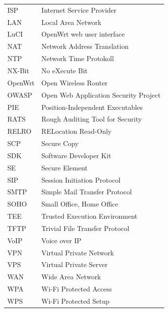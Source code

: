 \documentclass[a4paper]{book}
\begin{document}
\begin{large}
\begin{table}[!ht]
\begin{tabular}{ll}
ISP     & Internet Service Provider            \\
LAN     & Local Area Network                   \\
LuCI    & OpenWrt web user interface           \\
NAT     & Network Address Translation          \\
NTP     & Network Time Protokoll               \\
NX-Bit  & No eXecute Bit                       \\
OpenWrt & Open Wireless Router                 \\
OWASP	& Open Web Application Security Project \\
PIE     & Position-Independent Executables     \\
RATS    & Rough Auditing Tool for Security     \\
RELRO   & RELocation Read-Only                 \\
SCP     & Secure Copy                          \\
SDK     & Software Developer Kit               \\
SE      & Secure Element                       \\
SIP     & Session Initiation Protocol          \\
SMTP    & Simple Mail Transfer Protocol        \\
SOHO    & Small Office, Home Office            \\
TEE     & Trusted Execution   Environment      \\
TFTP    & Trivial File Transfer Protocol       \\
VoIP    & Voice over IP                        \\
VPN     & Virtual Private Network              \\
VPS     & Virtual Private Server               \\
WAN     & Wide Area Network                    \\
WPA     & Wi-Fi Protected Access               \\
WPS     & Wi-Fi Protected Setup 
\end{tabular}
\end{table}

\let\cleardoublepage\cleardoublepage



\tableofcontents           %
\cleardoublepage
{}



\end{large}
\end{document}
